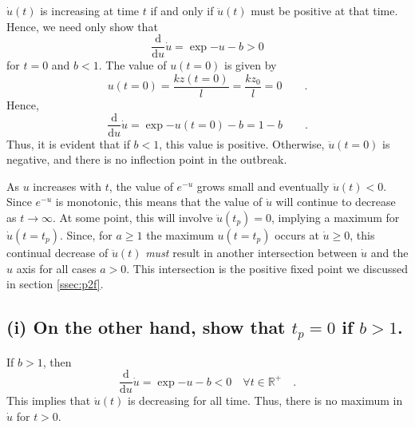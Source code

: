 \documentclass[draft]{agujournal2019}
\begin{document}
$\dot u(t)$ is increasing at time $t$ if and only if $\ddot u(t)$ must be positive at that time. Hence, we need only show that 
\begin{equation*}
    \frac{\mathrm{d}}{\mathrm{d}u} \dot u = \exp{-u} - b > 0 
\end{equation*}
for $t=0$ and $b<1$. The value of $u(t=0)$ is given by
\begin{equation*}
    u(t=0) = \frac{kz(t=0)}{l} = \frac{kz_0}{l} = 0 \qquad .
\end{equation*}
Hence, 
\begin{equation*}
    \frac{\mathrm{d}}{\mathrm{d}u} \dot u = \exp{-u(t=0)} - b = 1 - b \qquad . 
\end{equation*}
Thus, it is evident that if $b<1$, this value is positive. Otherwise, $\ddot u(t=0)$ is negative, and there is no inflection point in the outbreak. 
\par
As $u$ increases with $t$, the value of $e^{-u}$ grows small and eventually $\ddot u(t)<0$. Since $e^{-u}$ is monotonic, this means that the value of $\dot u$ will continue to decrease as $t\longrightarrow\infty$. At some point, this will involve $\ddot u(t_p) = 0$, implying a maximum for $\dot u(t=t_p)$. Since, for $a\geq1$ the maximum $u(t=t_p)$ occurs at $\dot u \geq 0$, this continual decrease of $\ddot u(t)$ \emph{must} result in another intersection between $\dot u$ and the $u$ axis for all cases $a>0$. This intersection is the positive fixed point we discussed in section \ref{ssec:p2f}. 



\subsection{(i) On the other hand, show that $t_p=0$ if $b>1$. }
\label{ssec:p2i}
\par
If $b>1$, then 
\begin{equation*}
    \frac{\mathrm{d}}{\mathrm{d}u} \dot u = \exp{-u} - b < 0 \quad \forall t\in \mathbb{R}^+ \quad .
\end{equation*}
This implies that $\dot u(t)$ is decreasing for all time. Thus, there is no maximum in $\dot u$ for $t>0$.
\par
\end{document}
